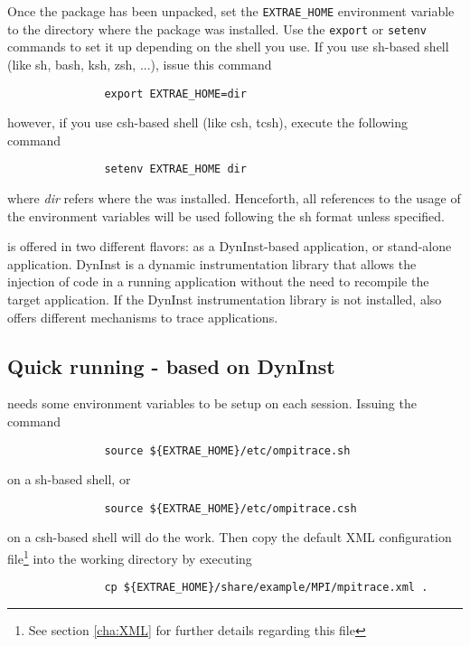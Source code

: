 Once the package has been unpacked, set the {\tt EXTRAE\_HOME} environment variable to the directory where the package was installed. Use the {\tt export} or {\tt setenv} commands to set it up depending on the shell you use.  If you use sh-based shell (like sh, bash, ksh, zsh, ...), issue this command
\begin{verbatim}
               export EXTRAE_HOME=dir
\end{verbatim}
however, if you use csh-based shell (like csh, tcsh), execute the following command
\begin{verbatim}
               setenv EXTRAE_HOME dir
\end{verbatim}
where {\em dir} refers where the \TRACE was installed. Henceforth, all references to the usage of the environment variables will be used following the sh format unless specified.

\TRACE is offered in two different flavors: as a DynInst-based application, or stand-alone application. DynInst is a dynamic instrumentation library that allows the injection of code in a running application without the need to recompile the target application. If the DynInst instrumentation library is not installed, \TRACE also offers different mechanisms to trace applications.

\subsection{Quick running \TRACE - based on DynInst}\label{subsec:RunningTraceDynInst}

\TRACE needs some environment variables to be setup on each session. Issuing the command 

\begin{verbatim}
               source ${EXTRAE_HOME}/etc/ompitrace.sh
\end{verbatim}

on a sh-based shell, or 

\begin{verbatim}
               source ${EXTRAE_HOME}/etc/ompitrace.csh
\end{verbatim}

on a csh-based shell will do the work. Then copy the default XML configuration file\footnote{See section \ref{cha:XML} for further details regarding this file} into the working directory by executing

\begin{verbatim}
               cp ${EXTRAE_HOME}/share/example/MPI/mpitrace.xml .
\end{verbatim}

